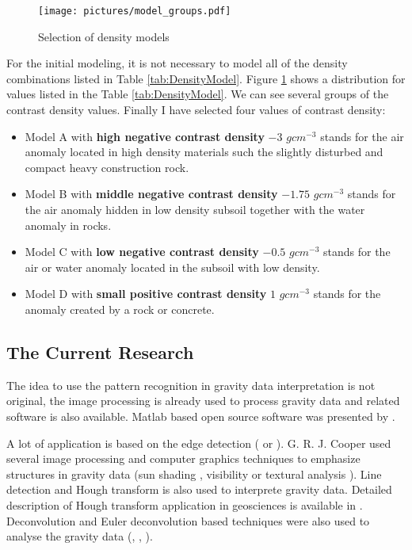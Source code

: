 \documentclass[FM]{tulthesis}
\begin{document}
\begin{figure}[ht]
\centerline{\texttt{[image: pictures/model\_groups.pdf]}}
\renewcommand{\figurename}{Figure}
\caption[Selection of density models]{Selection of density models}
\label{fig:SelectionModel}
\end{figure}


For the initial modeling, it is not necessary to model all of the density combinations listed in Table \ref{tab:DensityModel}. Figure \ref{fig:SelectionModel} shows a distribution for values listed in the Table \ref{tab:DensityModel}. We can see several groups of the contrast density values. Finally I have selected four values of contrast density:

\begin{itemize}
\item Model A with \textbf{high negative contrast density} $-3$ $gcm^{-3}$ stands for the air anomaly located in high density materials such the slightly disturbed and compact heavy construction rock.
\item Model B with \textbf{middle negative contrast density} $-1.75$ $gcm^{-3}$ stands for the air anomaly hidden in low density subsoil together with the water anomaly in rocks.
\item Model C with \textbf{low negative contrast density} $-0.5$ $gcm^{-3}$ stands for the air or water anomaly located in the subsoil with low density. 
\item Model D with \textbf{small positive contrast density} $1$ $gcm^{-3}$ stands for the anomaly created by a rock or concrete.
\end{itemize}


\subsection{The Current Research} \label{sec:GraviCurrentResearch}

The idea to use the pattern recognition in gravity data interpretation is not original, the image processing is already used to process gravity data and related software is also available.  Matlab based open source software was presented by \cite{Ozgu}. 

A lot of application is based on the edge detection (\cite{Sertcelik} or \cite{Aydogan}). G. R. J. Cooper used several image processing and computer graphics techniques to emphasize structures in gravity data (sun shading \cite{Cooper2003}, visibility \cite{Cooper2005} or textural analysis \cite{Cooper2004}). Line detection and Hough transform is also used to interprete gravity data. Detailed description of Hough transform application in geosciences is available in \cite{Fitton}. Deconvolution and Euler deconvolution based techniques were also used to analyse the gravity data (\cite{Salem}, \cite{Fitzgerald}, \cite{Cooper2008}).
\end{document}
